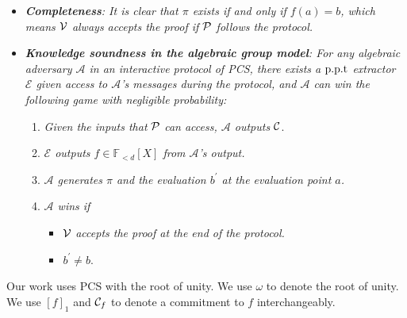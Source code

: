 \begin{itemize}
    \item \textit{\textbf{Completeness}: It is clear that $\pi$ exists if and only if $f(a)=b$, which means $\mathcal{V}$ always accepts the proof if $\mathcal{P}$ follows the protocol.}
    \item \textit{\textbf{Knowledge soundness in the algebraic group model}: For any algebraic adversary $\mathcal{A}$ in an interactive protocol of PCS, there exists a $\text{p.p.t}$ extractor $\mathcal{E}$ given access to $\mathcal{A}$'s messages during the protocol, and $\mathcal{A}$ can win the following game with negligible probability:}
    \begin{enumerate}
        \item \textit{Given the inputs that} $\mathcal{P}$ \textit{can access, $\mathcal{A}$ outputs} $\mathcal{C}$.
        \item \textit{$\mathcal{E}$ outputs $f\in\mathbb{F}_{<d}[X]$ from $\mathcal{A}$'s output.}
        \item \textit{$\mathcal{A}$ generates $\pi$ and the evaluation $b^\prime$ at the evaluation point $a$.}
        \item \textit{$\mathcal{A}$ wins if}
        \begin{itemize}
            \item $\mathcal{V}$ \textit{accepts the proof at the end of the protocol.}
            \item $b^\prime\ne{b}$.
        \end{itemize}
    \end{enumerate}
\end{itemize}
Our work uses PCS with the root of unity. We use $\omega$ to denote the root of unity. We use $[f]_1$ and $\mathcal{C}_f$ to denote a commitment to $f$ interchangeably.

